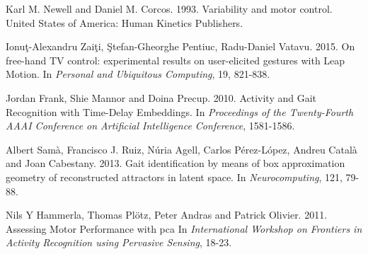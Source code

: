 \documentclass[a0paper,portrait]{baposter}
\begin{document}
\begin{poster}
{\begin{thebibliography}{1}
  Karl M. Newell and Daniel M. Corcos. 1993.
  \newblock Variability and motor control.
  \newblock United States of America: Human Kinetics Publishers.

  Ionuţ-Alexandru Zaiţi, Ştefan-Gheorghe Pentiuc, Radu-Daniel Vatavu. 2015.
  \newblock On free-hand TV control: experimental results on user-elicited gestures with Leap Motion.
  \newblock In {\em Personal and Ubiquitous Computing}, 19, 821-838.

  
  Jordan Frank, Shie Mannor and Doina Precup. 2010. 
  \newblock Activity and Gait Recognition with Time-Delay Embeddings.
  \newblock In {\em Proceedings of the Twenty-Fourth AAAI Conference on Artificial Intelligence Conference}, 1581-1586.
  
  Albert Samà, Francisco J. Ruiz, Núria Agell, Carlos Pérez-López, Andreu Català and Joan Cabestany. 2013.
  \newblock Gait identification by means of box approximation geometry of reconstructed attractors in latent space.
  \newblock In {\em Neurocomputing}, 121, 79-88.

  
  Nils Y Hammerla, Thomas Plötz, Peter Andras and Patrick Olivier. 2011.
  \newblock Assessing Motor Performance with pca
  \newblock In {\em International Workshop on Frontiers in Activity Recognition using Pervasive Sensing}, 18-23.

\end{thebibliography}
}


\end{poster}
\end{document}
